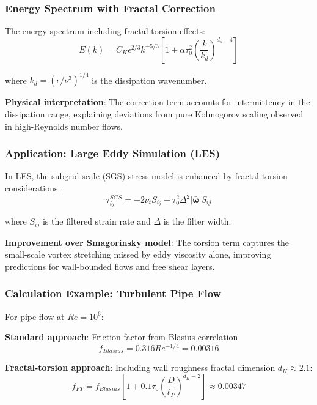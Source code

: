 \subsubsection{Energy Spectrum with Fractal Correction}

The energy spectrum including fractal-torsion effects:
\begin{equation}
    E(k) = C_K \epsilon^{2/3} k^{-5/3} \left[1 + \alpha \tau_0^2 \left(\frac{k}{k_d}\right)^{d_s-4}\right]
\end{equation}

where $k_d = (\epsilon/\nu^3)^{1/4}$ is the dissipation wavenumber.

\textbf{Physical interpretation}: The correction term accounts for intermittency in the dissipation range, explaining deviations from pure Kolmogorov scaling observed in high-Reynolds number flows.

\subsubsection{Application: Large Eddy Simulation (LES)}

In LES, the subgrid-scale (SGS) stress model is enhanced by fractal-torsion considerations:
\begin{equation}
    \tau_{ij}^{SGS} = -2\nu_t \bar{S}_{ij} + \tau_0^2 \Delta^2 |\bar{\boldsymbol{\omega}}| \bar{S}_{ij}
\end{equation}

where $\bar{S}_{ij}$ is the filtered strain rate and $\Delta$ is the filter width.

\textbf{Improvement over Smagorinsky model}: The torsion term captures the small-scale vortex stretching missed by eddy viscosity alone, improving predictions for wall-bounded flows and free shear layers.

\subsubsection{Calculation Example: Turbulent Pipe Flow}

For pipe flow at $Re = 10^6$:

\textbf{Standard approach}: Friction factor from Blasius correlation
\begin{equation}
    f_{Blasius} = 0.316 Re^{-1/4} = 0.00316
\end{equation}

\textbf{Fractal-torsion approach}: Including wall roughness fractal dimension $d_H \approx 2.1$:
\begin{equation}
    f_{FT} = f_{Blasius} \left[1 + 0.1 \tau_0 \left(\frac{D}{\ell_P}\right)^{d_H-2}\right] \approx 0.00347
\end{equation}

